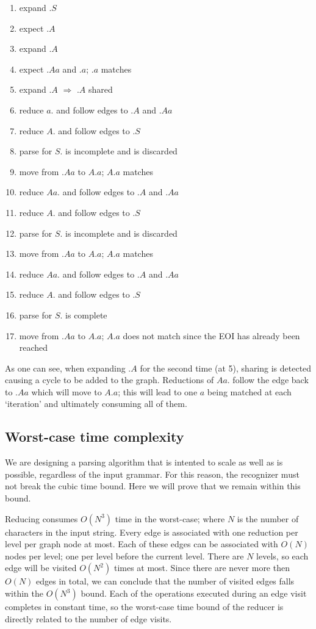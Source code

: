\documentclass[a4paper,10pt]{article}
\begin{document}
\begin{enumerate}
 \setlength{\itemsep}{0pt}
 \setlength{\parskip}{0pt}
 \setlength{\parsep}{0pt}
 
 \item expand $.S$
 \item expect $.A$
 \item expand $.A$
 \item expect $.Aa$ and $.a$; $.a$ matches
 \item expand $.A$ $\Rightarrow$ $.A$ shared
 \item reduce $a.$ and follow edges to $.A$ and $.Aa$
 \item reduce $A.$ and follow edges to $.S$
 \item parse for $S.$ is incomplete and is discarded
 \item move from $.Aa$ to $A.a$; $A.a$ matches
 \item reduce $Aa.$ and follow edges to $.A$ and $.Aa$
 \item reduce $A.$ and follow edges to $.S$
 \item parse for $S.$ is incomplete and is discarded
 \item move from $.Aa$ to $A.a$; $A.a$ matches
 \item reduce $Aa.$ and follow edges to $.A$ and $.Aa$
 \item reduce $A.$ and follow edges to $.S$
 \item parse for $S.$ is complete
 \item move from $.Aa$ to $A.a$; $A.a$ does not match since the EOI has already been reached
\end{enumerate}
As one can see, when expanding $.A$ for the second time (at 5), sharing is detected causing a cycle to be added to the graph. Reductions of $Aa.$ follow the edge back to $.Aa$ which will move to $A.a$; this will lead to one $a$ being matched at each `iteration' and ultimately consuming all of them.

\subsection{Worst-case time complexity}
\label{subsec:recognizerComplexity}

We are designing a parsing algorithm that is intented to scale as well as is possible, regardless of the input grammar. For this reason, the recognizer must not break the cubic time bound. Here we will prove that we remain within this bound.

Reducing consumes $O(N^3)$ time in the worst-case; where $N$ is the number of characters in the input string. Every edge is associated with one reduction per level per graph node at most. Each of these edges can be associated with $O(N)$ nodes per level; one per level before the current level. There are $N$ levels, so each edge will be visited $O(N^2)$ times at most. Since there are never more then $O(N)$ edges in total, we can conclude that the number of visited edges falls within the $O(N^3)$ bound. Each of the operations executed during an edge visit completes in constant time, so the worst-case time bound of the reducer is directly related to the number of edge visits.
\end{document}
